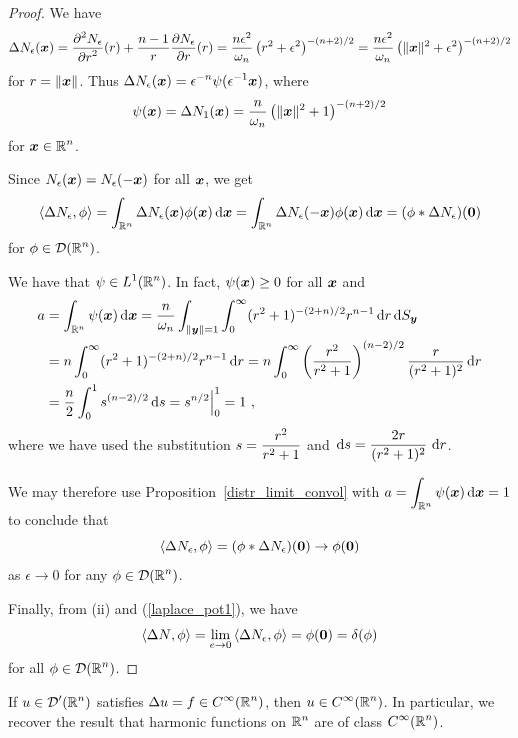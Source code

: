 \begin{proof}
 We have
\[
\Delta N_\epsilon({\bm{x}}) = \frac{\displaystyle \partial^{2}{N_\epsilon}} {\displaystyle \partial r^{2}}(r) +
\frac{n-1}{r} \frac{\partial{N_\epsilon}}{\partial r}(r)
= \frac{n\epsilon^2}{\omega_n} \left(r^2+\epsilon^2 \right)^{-(n+2)/2}
= \frac{n\epsilon^2}{\omega_n}
\left(\|{\bm{x}}\|^2+\epsilon^2 \right)^{-(n+2)/2}
\]
for $r = \|{\bm{x}}\|$. Thus
$\displaystyle
\Delta N_\epsilon({\bm{x}}) = \epsilon^{-n} \psi(\epsilon^{-1} {\bm{x}})$,
where
\[
\psi({\bm{x}}) = \Delta N_1({\bm{x}}) = \frac{n}{\omega_n}
\left(\|{\bm{x}}\|^2 + 1 \right)^{-(n+2)/2}
\]
for $\displaystyle {\bm{x}} \in \mathbb{R}^n$.

Since $N_\epsilon({\bm{x}}) = N_\epsilon(-{\bm{x}})$ for all
${\bm{x}}$, we get
\[
\left\langle{\Delta N_\epsilon} , {\phi}\right\rangle =
\int_{\mathbb{R}^n} \Delta N_\epsilon({\bm{x}}) \phi({\bm{x}}) \,\mathrm{d}{{\bm{x}}}
= \int_{\mathbb{R}^n} \Delta N_\epsilon(-{\bm{x}}) \phi({\bm{x}}) \,\mathrm{d}{{\bm{x}}} \\
= (\phi \ast \Delta N_\epsilon)({\bm{0}})
\]
for $\displaystyle \phi \in \mathcal{D}(\mathbb{R}^n)$.

We have that $\displaystyle \psi \in L^1(\mathbb{R}^n)$.  In fact,
$\psi({\bm{x}}) \geq 0$ for all ${\bm{x}}$ and
\begin{align*}
a &= \int_{\RR^n} \psi(\VEC{x}) \dx{\VEC{x}}
= \frac{n}{\omega_n} \int_{\|\VEC{y}\|=1} \int_0^\infty
(r^2+1)^{-(2+n)/2} r^{n-1} \dx{r} \dss{S}{y} \\
&= n \int_0^\infty (r^2+1)^{-(2+n)/2} r^{n-1} \dx{r}
= n \int_0^\infty \left(\frac{r^2}{r^2+1}\right)^{(n-2)/2}
\frac{r}{(r^2+1)^2} \dx{r} \\
&= \frac{n}{2} \int_0^1 s^{(n-2)/2} \dx{s} = s^{n/2}\Big|_0^1 = 1 \ ,
\end{align*}
where we have used the substitution $\displaystyle s = \frac{r^2}{r^2+1}$
and $\displaystyle \,\mathrm{d}{s} = \frac{2r}{(r^2+1)^2} \, \,\mathrm{d}{r}$.

We may therefore use Proposition~\ref{distr_limit_convol} with
$\displaystyle a = \int_{\mathbb{R}^n} \psi({\bm{x}}) \,\mathrm{d}{{\bm{x}}} = 1$
to conclude that
\begin{equation} \label{laplace_pot1}
\left\langle{\Delta N_\epsilon} , {\phi}\right\rangle = (\phi \ast \Delta N_\epsilon)({\bm{0}})
\rightarrow \phi({\bm{0}})
\end{equation}
as $\epsilon \rightarrow 0$ for any $\displaystyle \phi \in \mathcal{D}(\mathbb{R}^n)$.

Finally, from (ii) and (\ref{laplace_pot1}), we have
\[
\left\langle{\Delta N} , {\phi}\right\rangle =
\lim_{e\rightarrow 0} \left\langle{\Delta N_\epsilon} , {\phi}\right\rangle 
= \phi({\bm{0}}) = \delta(\phi)
\]
for all $\displaystyle \phi\in \mathcal{D}(\mathbb{R}^n)$.
\end{proof}

\begin{cor} \label{lapl_anal_cond}
If $\displaystyle u\in \mathcal{D}'(\mathbb{R}^n)$ satisfies
$\displaystyle \Delta u = f \in C^\infty(\mathbb{R}^n)$,
then $\displaystyle u \in C^\infty(\mathbb{R}^n)$.  In particular, we recover the
result that harmonic functions on $\displaystyle \mathbb{R}^n$ are of class
$\displaystyle C^\infty(\mathbb{R}^n)$.
\end{cor}

